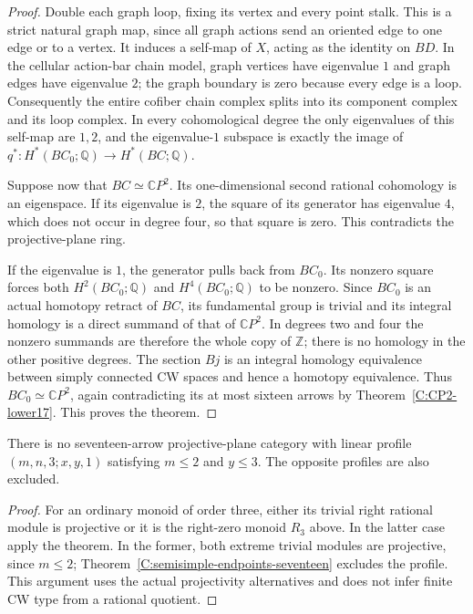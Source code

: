 \begin{proof}
Double each graph loop, fixing its vertex and every point
stalk. This is a strict natural graph map, since all graph
actions send an oriented edge to one edge or to a vertex.
It induces a self-map of $X$, acting as the identity on $BD$.
In the cellular action-bar chain model, graph vertices have
eigenvalue $1$ and graph edges have eigenvalue $2$; the graph
boundary is zero because every edge is a loop. Consequently
the entire cofiber chain complex splits into its component
complex and its loop complex. In every cohomological degree
the only eigenvalues of this self-map are $1,2$, and the
eigenvalue-$1$ subspace is exactly the image of
$q^*:H^*(BC_0;\mathbb Q)\to H^*(BC;\mathbb Q)$.

Suppose now that $BC\simeq\mathbb CP^2$. Its one-dimensional
second rational cohomology is an eigenspace. If its eigenvalue
is $2$, the square of its generator has eigenvalue $4$, which
does not occur in degree four, so that square is zero. This
contradicts the projective-plane ring.

If the eigenvalue is $1$, the generator pulls back from $BC_0$.
Its nonzero square forces both $H^2(BC_0;\mathbb Q)$ and
$H^4(BC_0;\mathbb Q)$ to be nonzero. Since $BC_0$ is an actual
homotopy retract of $BC$, its fundamental group is trivial and
its integral homology is a direct summand of that of
$\mathbb CP^2$. In degrees two and four the nonzero summands
are therefore the whole copy of $\mathbb Z$; there is no
homology in the other positive degrees. The section $Bj$ is
an integral homology equivalence between simply connected
CW spaces and hence a homotopy equivalence. Thus
$BC_0\simeq\mathbb CP^2$, again contradicting its at most
sixteen arrows by Theorem~\ref{C:CP2-lower17}. This proves the theorem.
\end{proof}

\begin{corollary}\label{C:small-last-stalk-seventeen-profile}
There is no seventeen-arrow projective-plane category with
linear profile $(m,n,3;x,y,1)$ satisfying $m\leq2$ and
$y\leq3$. The opposite profiles are also excluded.
\end{corollary}
\begin{proof}
For an ordinary monoid of order three, either its trivial right
rational module is projective or it is the right-zero monoid
$R_3$ above. In the latter case apply the theorem. In the former,
both extreme trivial modules are projective, since $m\leq2$;
Theorem~\ref{C:semisimple-endpoints-seventeen} excludes the
profile. This argument uses the actual projectivity alternatives
and does not infer finite CW type from a rational quotient.
\end{proof}
